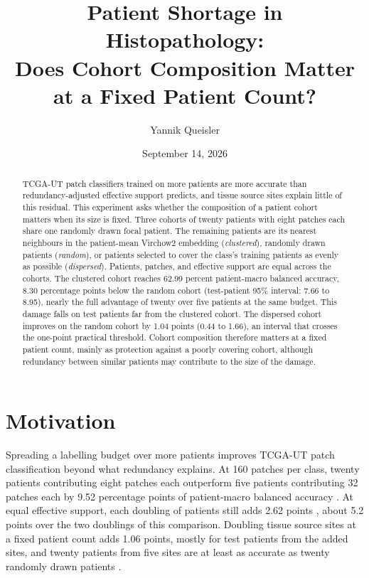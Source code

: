 \documentclass[11pt]{article}
\title{Patient Shortage in Histopathology:\\Does Cohort Composition Matter\\at a Fixed Patient Count?}
\author{Yannik Queisler}
\date{September 14, 2026}
\begin{document}
\raggedbottom
{}
\setlength{\emergencystretch}{2em}
\maketitle
\begin{abstract}
\noindent TCGA-UT patch classifiers trained on more patients are more accurate than redundancy-adjusted effective support predicts, and tissue source sites explain little of this residual. This experiment asks whether the composition of a patient cohort matters when its size is fixed. Three cohorts of twenty patients with eight patches each share one randomly drawn focal patient. The remaining patients are its nearest neighbours in the patient-mean Virchow2 embedding (\emph{clustered}), randomly drawn patients (\emph{random}), or patients selected to cover the class's training patients as evenly as possible (\emph{dispersed}). Patients, patches, and effective support are equal across the cohorts. The clustered cohort reaches 62.99 percent patient-macro balanced accuracy, 8.30 percentage points below the random cohort (test-patient 95\% interval: 7.66 to 8.95), nearly the full advantage of twenty over five patients at the same budget. This damage falls on test patients far from the clustered cohort. The dispersed cohort improves on the random cohort by 1.04 points (0.44 to 1.66), an interval that crosses the one-point practical threshold. Cohort composition therefore matters at a fixed patient count, mainly as protection against a poorly covering cohort, although redundancy between similar patients may contribute to the size of the damage.
\end{abstract}
\setcounter{tocdepth}{1}
\tableofcontents
\clearpage

\section{Motivation}
\label{sec:motivation}
Spreading a labelling budget over more patients improves TCGA-UT patch classification beyond what redundancy explains. At 160 patches per class, twenty patients contributing eight patches each outperform five patients contributing 32 patches each by 9.52 percentage points of patient-macro balanced accuracy \citep{queisler2026effectiveSupport}. At equal effective support, each doubling of patients still adds 2.62 points \citep{queisler2026multidirectionalRedundancy}, about 5.2 points over the two doublings of this comparison. Doubling tissue source sites at a fixed patient count adds 1.06 points, mostly for test patients from the added sites, and twenty patients from five sites are at least as accurate as twenty randomly drawn patients \citep{queisler2026siteCoverage}.
\end{document}
